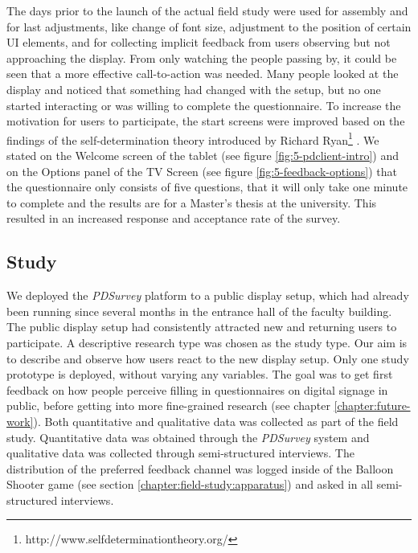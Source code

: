 	The days prior to the launch of the actual field study were used for assembly and for last adjustments, like change of font size, adjustment to the position of certain UI elements, and for collecting implicit feedback from users observing but not approaching the display. From only watching the people passing by, it could be seen that a more effective call-to-action was needed. Many people looked at the display and noticed that something had changed with the setup, but no one started interacting or was willing to complete the questionnaire. To increase the motivation for users to participate, the start screens were improved based on the findings of the self-determination theory introduced by Richard Ryan\footnote{http://www.selfdeterminationtheory.org/} \cite{ryan2000self}. We stated on the Welcome screen of the tablet (see figure \ref{fig:5-pdclient-intro}) and on the Options panel of the TV Screen (see figure \ref{fig:5-feedback-options}) that the questionnaire only consists of five questions, that it will only take one minute to complete and the results are for a Master's thesis at the university. This resulted in an increased response and acceptance rate of the survey.



	



\subsection{Study}

	We deployed the \textit{PDSurvey} platform to a public display setup, which had already been running since several months in the entrance hall of the faculty building. The public display setup had consistently attracted new and returning users to participate. A descriptive research type was chosen as the study type. Our aim is to describe and observe how users react to the new display setup. Only one study prototype is deployed, without varying any variables. The goal was to get first feedback on how people perceive filling in questionnaires on digital signage in public, before getting into more fine-grained research (see chapter \ref{chapter:future-work}). 
	Both quantitative and qualitative data was collected as part of the field study. Quantitative data was obtained through the \textit{PDSurvey} system and qualitative data was collected through semi-structured interviews.
	The distribution of the preferred feedback channel was logged inside of the Balloon Shooter game (see section \ref{chapter:field-study:apparatus}) and asked in all semi-structured interviews.


